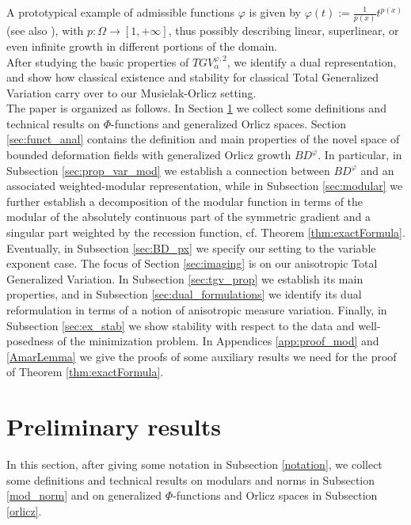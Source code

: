 \documentclass[a4paper,11pt,oneside,notitlepage]{article}
\numberwithin{equation}{section}
\newcommand{\vphi}{\varphi}
\begin{document}
A prototypical example of admissible functions $\vphi$ is given by $\varphi(t) := \tfrac{1}{p(x)} t^{p(x)}$ (see also \cite[Example 4.3]{EHH}), with $p : \Omega \to [1,+\infty]$, thus possibly describing linear, superlinear, or even infinite growth in different portions of the domain.
\\
After studying the basic properties of $TGV^{\vphi,2}_\alpha$, we identify a dual representation, and show how classical existence and stability for classical Total Generalized Variation carry over to our Musielak-Orlicz setting.
\\
The paper is organized as follows. In Section \ref{prelim} we collect some definitions and technical results on $\Phi$-functions and generalized Orlicz spaces. Section \ref{sec:funct_anal} contains the definition and main properties of the novel space of  bounded deformation fields with generalized Orlicz growth $BD^\vphi$. In particular, in Subsection \ref{sec:prop_var_mod} we establish a connection between $BD^{\vphi}$ and an associated weighted-modular representation, while in Subsection \ref{sec:modular} we further establish a decomposition of the modular function in terms of the modular of the absolutely continuous part of the symmetric gradient and a singular part weighted by the recession function, cf. Theorem \ref{thm:exactFormula}. Eventually, in Subsection \ref{sec:BD_px} we specify our setting to the variable exponent case. The focus of Section \ref{sec:imaging} is on our anisotropic Total Generalized Variation. In Subsection \ref{sec:tgv_prop} we establish its main properties, and in Subsection \ref{sec:dual_formulations} we identify its dual reformulation in terms of a notion of anisotropic measure variation. Finally, in Subsection \ref{sec:ex_stab} we show stability with respect to the data and well-posedness of the minimization problem. In Appendices \ref{app:proof_mod} and \ref{AmarLemma} we give the proofs of some auxiliary results we need for the proof of Theorem \ref{thm:exactFormula}.


\section{Preliminary results}
\label{prelim}

In this section, after giving some notation in Subsection \ref{notation}, we collect some definitions and technical results on modulars and norms in Subsection \ref{mod_norm} and on generalized $\Phi$-functions and Orlicz spaces in Subsection \ref{orlicz}.
\end{document}
